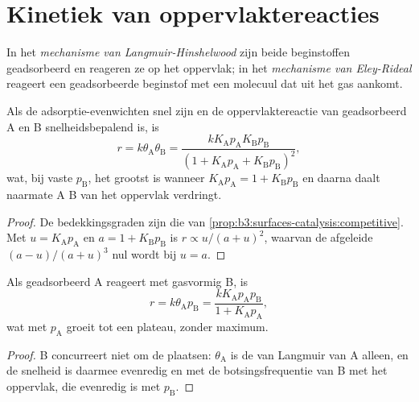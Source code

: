 \section{Kinetiek van oppervlaktereacties}

\begin{definition}\label{def:b3:surfaces-catalysis:mechanisms}
In het \emph{mechanisme van
Langmuir-Hinshelwood} zijn beide
beginstoffen geadsorbeerd en reageren ze op het oppervlak; in het
\emph{mechanisme van Eley-Rideal}
reageert een geadsorbeerde beginstof met een molecuul dat uit het gas
aankomt.
\end{definition}

\begin{proposition}\label{prop:b3:surfaces-catalysis:lh-rate}
Als de adsorptie-evenwichten snel zijn en de oppervlaktereactie van
geadsorbeerd A en B snelheidsbepalend is, is
\[
  r = k\theta_{\mathrm A}\theta_{\mathrm B} = \frac{kK_{\mathrm A}p_{\mathrm A}K_{\mathrm B}p_{\mathrm B}}{(1 + K_{\mathrm A}p_{\mathrm A} + K_{\mathrm B}p_{\mathrm B})^2},
\]
wat, bij vaste $p_{\mathrm B}$, het grootst is wanneer $K_{\mathrm A}p_{\mathrm A} = 1 + K_{\mathrm B}p_{\mathrm B}$ en daarna
daalt naarmate A B van het oppervlak verdringt.
\end{proposition}

\begin{proof}
De bedekkingsgraden zijn die van \cref{prop:b3:surfaces-catalysis:competitive}. Met $u =
K_{\mathrm A}p_{\mathrm A}$ en $a = 1 + K_{\mathrm B}p_{\mathrm B}$ is $r \propto u/(a + u)^2$, waarvan de afgeleide $(a - u)/(a + u)^3$ nul wordt bij
$u = a$.
\end{proof}

\begin{proposition}\label{prop:b3:surfaces-catalysis:er-rate}
Als geadsorbeerd A reageert met gasvormig B, is
\[
  r = k\theta_{\mathrm A}p_{\mathrm B} = \frac{kK_{\mathrm A}p_{\mathrm A}p_{\mathrm B}}{1 + K_{\mathrm A}p_{\mathrm A}},
\]
wat met $p_{\mathrm A}$ groeit tot een plateau, zonder maximum.
\end{proposition}

\begin{proof}
B concurreert niet om de plaatsen: $\theta_{\mathrm A}$ is de 
van Langmuir van A alleen, en de snelheid is daarmee evenredig en met de
botsingsfrequentie van B met het oppervlak, die evenredig is met $p_{\mathrm B}$.
\end{proof}

